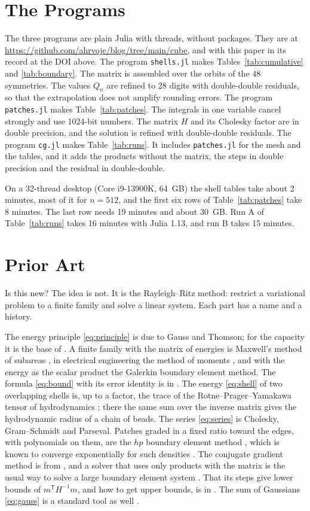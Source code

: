 \documentclass[journal]{IEEEtran}
\newcommand{\T}{\mathsf T}
\begin{document}
\section{The Programs}
The three programs are plain Julia with threads, without packages. They are at \url{https://github.com/ahrvoje/blog/tree/main/cube}, and with this paper in its record at the DOI above. The program \texttt{shells.jl} makes Tables~\ref{tab:cumulative} and \ref{tab:boundary}. The matrix is assembled over the orbits of the 48 symmetries. The values $Q_n$ are refined to 28 digits with double-double residuals, so that the extrapolation does not amplify rounding errors. The program \texttt{patches.jl} makes Table~\ref{tab:patches}. The integrals in one variable cancel strongly and use 1024-bit numbers. The matrix $H$ and its Cholesky factor are in double precision, and the solution is refined with double-double residuals. The program \texttt{cg.jl} makes Table~\ref{tab:runs}. It includes \texttt{patches.jl} for the mesh and the tables, and it adds the products without the matrix, the steps in double precision and the residual in double-double.

On a 32-thread desktop (Core i9-13900K, 64~GB) the shell tables take about 2 minutes, most of it for $n = 512$, and the first six rows of Table~\ref{tab:patches} take 8 minutes. The last row needs 19 minutes and about 30~GB. Run A of Table~\ref{tab:runs} takes 16 minutes with Julia 1.13, and run B takes 15 minutes.

\section{Prior Art}
Is this new? The idea is not. It is the Rayleigh--Ritz method: restrict a variational problem to a finite family and solve a linear system. Each part has a name and a history.

The energy principle \eqref{eq:principle} is due to Gauss and Thomson; for the capacity it is the base of \cite{polya}. A finite family with the matrix of energies is Maxwell's method of subareas \cite{maxwell}, in electrical engineering the method of moments \cite{harrington}, and with the energy as the scalar product the Galerkin boundary element method. The formula \eqref{eq:bound} with its error identity is in \cite{betcke}. The energy \eqref{eq:shell} of two overlapping shells is, up to a factor, the trace of the Rotne--Prager--Yamakawa tensor of hydrodynamics \cite{zuk}; there the same sum over the inverse matrix gives the hydrodynamic radius of a chain of beads. The series \eqref{eq:series} is Cholesky, Gram--Schmidt and Parseval. Patches graded in a fixed ratio toward the edges, with polynomials on them, are the $hp$ boundary element method \cite{gui,sauter}, which is known to converge exponentially for such densities \cite{babuska,heuer}. The conjugate gradient method is from \cite{hestenes}, and a solver that uses only products with the matrix is the usual way to solve a large boundary element system \cite{sauter}. That its steps give lower bounds of $m^{\T}H^{-1}m$, and how to get upper bounds, is in \cite{golub,golubbook}. The sum of Gaussians \eqref{eq:gauss} is a standard tool as well \cite{stenger,beylkin}.
\end{document}
